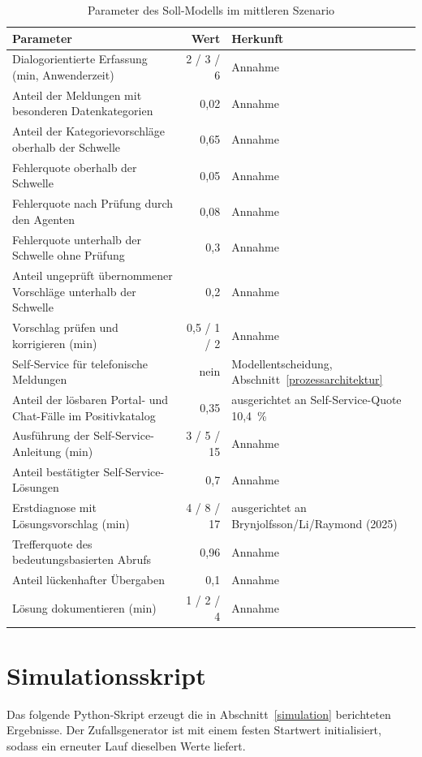 \begin{table}[!htb]
	\centering
	\caption{Parameter des Soll-Modells im mittleren Szenario}
	\label{tab:parameterSoll}
	\small
	\begin{tabularx}{\textwidth}{@{}>{\raggedright\arraybackslash}Xr>{\raggedright\arraybackslash}p{4.6cm}@{}}
		\toprule
		Parameter & Wert & Herkunft \\
		\midrule
		Dialogorientierte Erfassung (min, Anwenderzeit) & 2 / 3 / 6 & Annahme \\
		Anteil der Meldungen mit besonderen Datenkategorien & 0,02 & Annahme \\
		Anteil der Kategorievorschl\"age oberhalb der Schwelle & 0,65 & Annahme \\
		Fehlerquote oberhalb der Schwelle & 0,05 & Annahme \\
		Fehlerquote nach Pr\"ufung durch den Agenten & 0,08 & Annahme \\
		Fehlerquote unterhalb der Schwelle ohne Pr\"ufung & 0,3 & Annahme \\
		Anteil ungepr\"uft \"ubernommener Vorschl\"age unterhalb der Schwelle & 0,2 & Annahme \\
		Vorschlag pr\"ufen und korrigieren (min) & 0,5 / 1 / 2 & Annahme \\
		Self-Service f\"ur telefonische Meldungen & nein & Modellentscheidung, Abschnitt~\ref{prozessarchitektur} \\
		Anteil der l\"osbaren Portal- und Chat-F\"alle im Positivkatalog & 0,35 & ausgerichtet an Self-Service-Quote 10,4~\% \\
		Ausf\"uhrung der Self-Service-Anleitung (min) & 3 / 5 / 15 & Annahme \\
		Anteil best\"atigter Self-Service-L\"osungen & 0,7 & Annahme \\
		Erstdiagnose mit L\"osungsvorschlag (min) & 4 / 8 / 17 & ausgerichtet an Brynjolfsson/Li/Raymond (2025) \\
		Trefferquote des bedeutungsbasierten Abrufs & 0,96 & Annahme \\
		Anteil l\"uckenhafter \"Ubergaben & 0,1 & Annahme \\
		L\"osung dokumentieren (min) & 1 / 2 / 4 & Annahme \\
		\bottomrule
	\end{tabularx}
\end{table}

\clearpage
\section{Simulationsskript}
\label{anhangSkript}

Das folgende Python-Skript erzeugt die in Abschnitt~\ref{simulation} berichteten Ergebnisse. Der Zufallsgenerator ist mit einem festen Startwert initialisiert, sodass ein erneuter Lauf dieselben Werte liefert.


